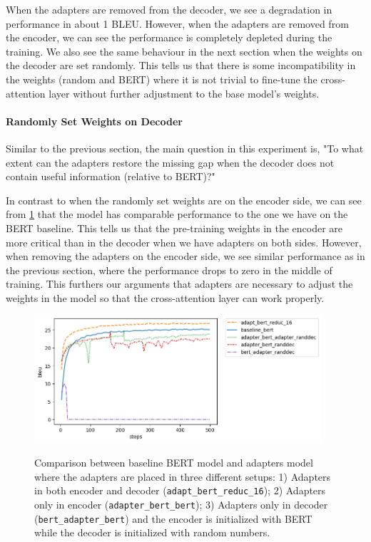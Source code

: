 When the adapters are removed from the decoder, we see a degradation in performance in about 1 BLEU. However, when the adapters are removed from the encoder, we can see the performance is completely depleted during the training. We also see the same behaviour in the next section when the weights on the decoder are set randomly. This tells us that there is some incompatibility in the weights (random and BERT) where it is not trivial to fine-tune the cross-attention layer without further adjustment to the base model's weights.

\paragraph{Randomly Set Weights on Decoder}
Similar to the previous section, the main question in this experiment is, "To what extent can the adapters restore the missing gap when the decoder does not contain useful information (relative to BERT)?"

In contrast to when the randomly set weights are on the encoder side, we can see from \cref{img:adapt_bert_randdec} that the model has comparable performance to the one we have on the BERT baseline. This tells us that the pre-training weights in the encoder are more critical than in the decoder when we have adapters on both sides. However, when removing the adapters on the encoder side, we see similar performance as in the previous section, where the performance drops to zero in the middle of training. This furthers our arguments that adapters are necessary to adjust the weights in the model so that the cross-attention layer can work properly.

\begin{figure}[h]
    {\includegraphics[width=0.95\textwidth]{img/adapter_bert_randdec.png}}
    \centering
    \caption[Comparison for model with adapters in the decoder and the decoder is initalized with random weights]{Comparison between baseline BERT model and adapters model where the adapters are placed in three different setups: 1) Adapters in both encoder and decoder (\texttt{adapt\_bert\_reduc\_16}); 2) Adapters only in encoder (\texttt{adapter\_bert\_bert}); 3) Adapters only in decoder (\texttt{bert\_adapter\_bert}) and the encoder is initialized with BERT while the decoder is initialized with random numbers.}
    \label{img:adapt_bert_randdec}
\end{figure}

